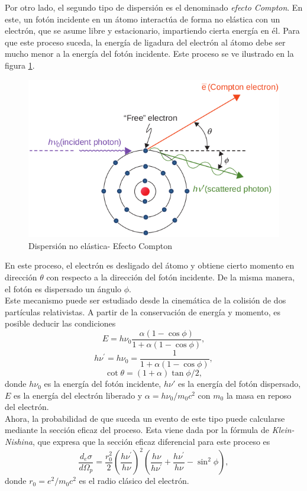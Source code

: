Por otro lado, el segundo tipo de dispersión es el denominado \textit{efecto Compton}. En este, un fotón incidente en un átomo interactúa de forma no elástica con un electrón, que se asume libre y estacionario, impartiendo cierta energía en él. Para que este proceso suceda, la energía de ligadura del electrón al átomo debe ser mucho menor a la energía del fotón incidente. Este proceso se ve ilustrado en la figura \ref{fig:compton}.\\
\begin{figure}[H]
	\centering
	\includegraphics[width=0.7\linewidth]{images/compton.png}
	\caption{Dispersión no elástica- Efecto Compton \cite{khan2014the}}
	\label{fig:compton}
\end{figure}
En este proceso, el electrón es desligado del átomo y obtiene cierto momento en dirección $\theta$ con respecto a la dirección del fotón incidente. De la misma manera, el fotón es dispersado un ángulo $\phi$. \\

Este mecanismo puede ser estudiado desde la cinemática de la colisión de dos partículas relativistas. A partir de la conservación de energía y momento, es posible deducir las condiciones 
\begin{equation}
E=h \nu_{0} \frac{\alpha(1-\cos \phi)}{1+\alpha(1-\cos \phi)},
\end{equation}
\begin{equation}
h \nu^{\prime}=h \nu_{0}=\frac{1}{1+\alpha(1-\cos \phi)},
\end{equation}
\begin{equation}
\cot \theta=(1+\alpha) \tan \phi / 2,
\end{equation}
donde $h\nu_0$ es la energía del fotón incidente, $h\nu'$ es la energía del fotón dispersado, $E$ es la energía del electrón liberado y $\alpha=h\nu_0/m_0c^2$ con $m_0$ la masa en reposo del electrón. \\

Ahora, la probabilidad de que suceda un evento de este tipo puede calcularse mediante la sección eficaz del proceso. Esta viene dada por la fórmula de \textit{Klein-Nishina}, que expresa que la sección eficaz diferencial para este proceso es
\begin{equation}
\label{eqn:KleinNishina}
\frac{d_{e} \sigma}{d \Omega_{p}}=\frac{r_{0}^{2}}{2}\left(\frac{h \nu^{\prime}}{h \nu}\right)^{2}\left(\frac{h \nu}{h \nu^{\prime}}+\frac{h \nu^{\prime}}{h \nu}-\sin ^{2} \phi\right),
\end{equation}
donde $r_0=e^2/m_0c^2$ es el radio clásico del electrón.\\

